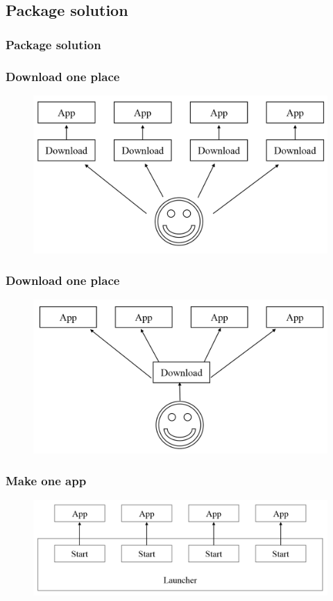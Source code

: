 \subsection{Package solution}
\begin{frame}
	\frametitle{Package solution}
\end{frame}

\begin{frame}
	\begin{center}
		\frametitle{Download one place}
		\begin{figure}[H]
			\centering
			\includegraphics[width= 0.8 \textwidth]{pictures/MultipleDownload.png}
		\end{figure}
	\end{center}
\end{frame}

\begin{frame}
	\begin{center}
		\frametitle{Download one place}
		\begin{figure}[H]
			\centering
			\includegraphics[width= 0.8 \textwidth]{pictures/DownloadOnePlace.png}
		\end{figure}
	\end{center}
\end{frame}

\begin{frame}
	\begin{center}
		\frametitle{Make one app}
		\begin{figure}[H]
			\centering
			\includegraphics[width= 0.8 \textwidth]{pictures/OldLauncher.png}
		\end{figure}
	\end{center}
\end{frame}

